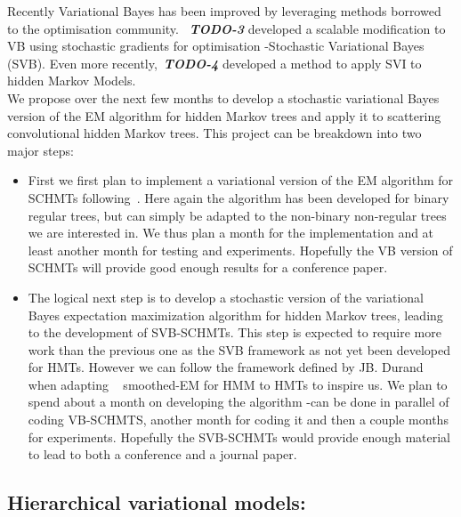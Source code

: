\documentclass[a4paper,11pt]{report}
\begin{document}
			Recently Variational Bayes has been improved by leveraging methods borrowed to the optimisation community. ~\textbf{\textit{TODO-3}} developed a scalable modification to VB using stochastic gradients for optimisation -Stochastic Variational Bayes (SVB). Even more recently,~\textbf{\textit{TODO-4}} developed a method to apply SVI to hidden Markov Models. \\
			
			We propose over the next few months to develop a stochastic variational Bayes version of the EM algorithm for hidden Markov trees and apply it to scattering convolutional hidden Markov trees. This project can be breakdown into two major steps:\\
			
			\begin{itemize}
			  \item First we first plan to implement a variational version of the EM algorithm for SCHMTs following~\cite{biology smoothed VB HMT}. Here again the algorithm has been developed for binary regular trees, but can simply be adapted to the non-binary non-regular trees we are interested in. We thus plan a month for the implementation and at least another month for testing and experiments. Hopefully the VB version of SCHMTs will provide good enough results for a conference paper.\\
			  
			  \item The logical next step is to develop a stochastic version of the variational Bayes expectation maximization algorithm for hidden Markov trees, leading to the development of SVB-SCHMTs.  This step is expected to require more work than the previous one as the SVB framework as not yet been developed for HMTs. However we can follow the framework defined by JB. Durand~\cite{durand2004computational} when adapting ~\cite{devijver1985baum} smoothed-EM for HMM to HMTs to inspire us. We plan to spend about a month on developing the algorithm -can be done in parallel of coding VB-SCHMTS, another month for coding it and then a couple months for experiments. Hopefully the SVB-SCHMTs would provide enough material to lead to both a conference and a journal paper.\\
			\end{itemize}

		\subsection{Hierarchical variational models:}
\end{document}
